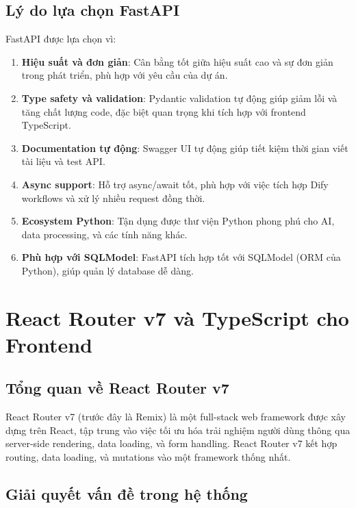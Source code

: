 \documentclass[../DoAn.tex]{subfiles}
\begin{document}
\subsection{Lý do lựa chọn FastAPI}

FastAPI được lựa chọn vì:

\begin{enumerate}
    \item \textbf{Hiệu suất và đơn giản}: Cân bằng tốt giữa hiệu suất cao và sự đơn giản trong phát triển, phù hợp với yêu cầu của dự án.
    
    \item \textbf{Type safety và validation}: Pydantic validation tự động giúp giảm lỗi và tăng chất lượng code, đặc biệt quan trọng khi tích hợp với frontend TypeScript.
    
    \item \textbf{Documentation tự động}: Swagger UI tự động giúp tiết kiệm thời gian viết tài liệu và test API.
    
    \item \textbf{Async support}: Hỗ trợ async/await tốt, phù hợp với việc tích hợp Dify workflows và xử lý nhiều request đồng thời.
    
    \item \textbf{Ecosystem Python}: Tận dụng được thư viện Python phong phú cho AI, data processing, và các tính năng khác.
    
    \item \textbf{Phù hợp với SQLModel}: FastAPI tích hợp tốt với SQLModel (ORM của Python), giúp quản lý database dễ dàng.
\end{enumerate}

\section{React Router v7 và TypeScript cho Frontend}
\label{section:3.3}

\subsection{Tổng quan về React Router v7}

React Router v7 (trước đây là Remix) là một full-stack web framework được xây dựng trên React, tập trung vào việc tối ưu hóa trải nghiệm người dùng thông qua server-side rendering, data loading, và form handling. React Router v7 kết hợp routing, data loading, và mutations vào một framework thống nhất.

\subsection{Giải quyết vấn đề trong hệ thống}
\end{document}
